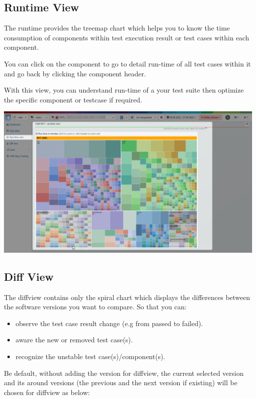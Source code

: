 \hypertarget{runtime-view}{%
\subsection{Runtime View}\label{runtime-view}}
The runtime provides the treemap chart which helps you to know the time 
consumption of components within test execution result or test cases within
each component.

You can click on the component to go to detail run-time of all test cases within 
it and go back by clicking the component header.

With this view, you can understand run-time of a your test suite then optimize
the specific component or testcase if required.

\includegraphics[width=1\linewidth]{./pictures/view_runtime.png}

\hypertarget{diff-view}{%
\subsection{Diff View}\label{diff-view}}
The diffview contains only the spiral chart which displays the differences 
between the software versions you want to compare. So that you can:
\begin{itemize}
   \item observe the test case result change (e.g from passed to failed).
   \item aware the new or removed test case(s).
   \item recognize the unstable test case(s)/component(s).
\end{itemize}

Be default, without adding the version for diffview, the current selected 
version and its around versions (the previous and the next version if existing) 
will be chosen for diffview as below:

